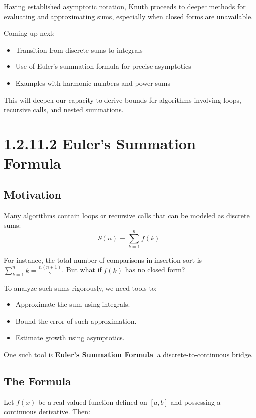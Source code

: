 \documentclass{article}
\begin{document}
Having established asymptotic notation, Knuth proceeds to deeper methods for evaluating and approximating sums, especially when closed forms are unavailable.

Coming up next:

\begin{itemize}
    \item Transition from discrete sums to integrals
    \item Use of Euler’s summation formula for precise asymptotics
    \item Examples with harmonic numbers and power sums
\end{itemize}

This will deepen our capacity to derive bounds for algorithms involving loops, recursive calls, and nested summations.

\newpage

\section*{1.2.11.2 Euler’s Summation Formula}

\subsection*{Motivation}

Many algorithms contain loops or recursive calls that can be modeled as discrete sums:
\[
S(n) = \sum_{k=1}^{n} f(k)
\]

For instance, the total number of comparisons in insertion sort is $\sum_{k=1}^{n} k = \frac{n(n+1)}{2}$. But what if $f(k)$ has no closed form?

To analyze such sums rigorously, we need tools to:
\begin{itemize}
    \item Approximate the sum using integrals.
    \item Bound the error of such approximation.
    \item Estimate growth using asymptotics.
\end{itemize}

One such tool is \textbf{Euler’s Summation Formula}, a discrete-to-continuous bridge.

\subsection*{The Formula}

Let $f(x)$ be a real-valued function defined on $[a, b]$ and possessing a continuous derivative. Then:
\end{document}
